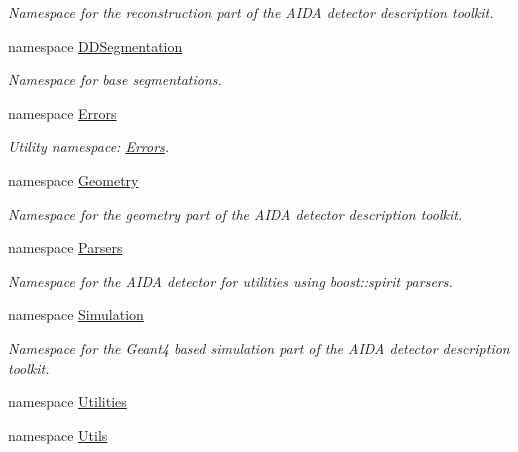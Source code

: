 \begin{DoxyCompactItemize}
\begin{DoxyCompactList}\small\item\em Namespace for the reconstruction part of the AIDA detector description toolkit. \item\end{DoxyCompactList}\item 
namespace \hyperlink{namespace_d_d4hep_1_1_d_d_segmentation}{DDSegmentation}


\begin{DoxyCompactList}\small\item\em Namespace for base segmentations. \item\end{DoxyCompactList}\item 
namespace \hyperlink{namespace_d_d4hep_1_1_errors}{Errors}


\begin{DoxyCompactList}\small\item\em Utility namespace: \hyperlink{namespace_d_d4hep_1_1_errors}{Errors}. \item\end{DoxyCompactList}\item 
namespace \hyperlink{namespace_d_d4hep_1_1_geometry}{Geometry}


\begin{DoxyCompactList}\small\item\em Namespace for the geometry part of the AIDA detector description toolkit. \item\end{DoxyCompactList}\item 
namespace \hyperlink{namespace_d_d4hep_1_1_parsers}{Parsers}


\begin{DoxyCompactList}\small\item\em Namespace for the AIDA detector for utilities using boost::spirit parsers. \item\end{DoxyCompactList}\item 
namespace \hyperlink{namespace_d_d4hep_1_1_simulation}{Simulation}


\begin{DoxyCompactList}\small\item\em Namespace for the Geant4 based simulation part of the AIDA detector description toolkit. \item\end{DoxyCompactList}\item 
namespace \hyperlink{namespace_d_d4hep_1_1_utilities}{Utilities}
\item 
namespace \hyperlink{namespace_d_d4hep_1_1_utils}{Utils}



\end{DoxyCompactItemize}

